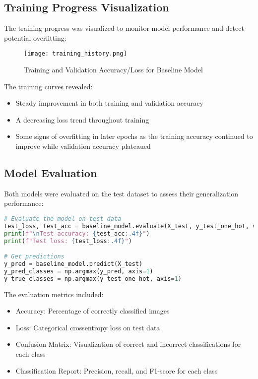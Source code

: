 \documentclass[12pt]{article}
\begin{document}
\subsection{Training Progress Visualization}
The training progress was visualized to monitor model performance and detect potential overfitting:

\begin{figure}[h]
    \centering
    \texttt{[image: training\_history.png]}
    \caption{Training and Validation Accuracy/Loss for Baseline Model}
\end{figure}

The training curves revealed:
\begin{itemize}
    \item Steady improvement in both training and validation accuracy
    \item A decreasing loss trend throughout training
    \item Some signs of overfitting in later epochs as the training accuracy continued to improve while validation accuracy plateaued
\end{itemize}

\subsection{Model Evaluation}
Both models were evaluated on the test dataset to assess their generalization performance:

\begin{lstlisting}[language=Python, caption=Model Evaluation]
# Evaluate the model on test data
test_loss, test_acc = baseline_model.evaluate(X_test, y_test_one_hot, verbose=1)
print(f"\nTest accuracy: {test_acc:.4f}")
print(f"Test loss: {test_loss:.4f}")

# Get predictions
y_pred = baseline_model.predict(X_test)
y_pred_classes = np.argmax(y_pred, axis=1)
y_true_classes = np.argmax(y_test_one_hot, axis=1)
\end{lstlisting}

The evaluation metrics included:
\begin{itemize}
    \item Accuracy: Percentage of correctly classified images
    \item Loss: Categorical crossentropy loss on test data
    \item Confusion Matrix: Visualization of correct and incorrect classifications for each class
    \item Classification Report: Precision, recall, and F1-score for each class
\end{itemize}
\end{document}
